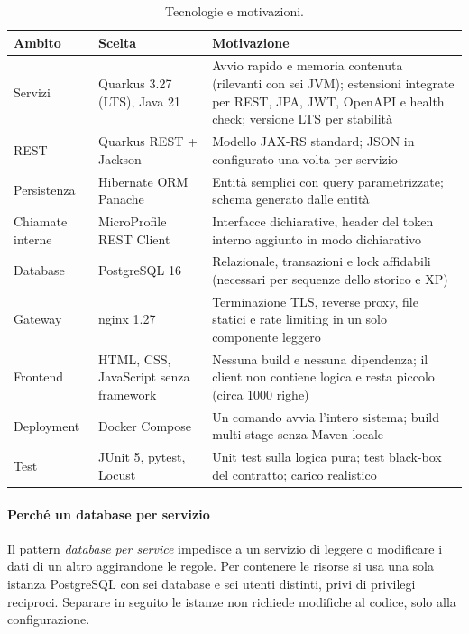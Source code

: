 \documentclass[11pt,a4paper]{report}
\begin{document}
\begin{table}[ht]
\centering\small
\begin{tabularx}{\linewidth}{@{}P{2.6cm}P{3.6cm}L@{}}
\toprule
\textbf{Ambito} & \textbf{Scelta} & \textbf{Motivazione} \\
\midrule
Servizi & Quarkus 3.27 (LTS), Java 21 & Avvio rapido e memoria contenuta (rilevanti con sei JVM); estensioni integrate per REST, JPA, JWT, OpenAPI e health check; versione LTS per stabilità \\
REST & Quarkus REST + Jackson & Modello JAX-RS standard; JSON in  configurato una volta per servizio \\
Persistenza & Hibernate ORM Panache & Entità semplici con query parametrizzate; schema generato dalle entità \\
Chiamate interne & MicroProfile REST Client & Interfacce dichiarative, header del token interno aggiunto in modo dichiarativo \\
Database & PostgreSQL 16 & Relazionale, transazioni e lock affidabili (necessari per sequenze dello storico e XP) \\
Gateway & nginx 1.27 & Terminazione TLS, reverse proxy, file statici e rate limiting in un solo componente leggero \\
Frontend & HTML, CSS, JavaScript senza framework & Nessuna build e nessuna dipendenza; il client non contiene logica e resta piccolo (circa 1000 righe) \\
Deployment & Docker Compose & Un comando avvia l'intero sistema; build multi-stage senza Maven locale \\
Test & JUnit 5, pytest, Locust & Unit test sulla logica pura; test black-box del contratto; carico realistico \\
\bottomrule
\end{tabularx}
\caption{Tecnologie e motivazioni.}
\end{table}

\paragraph{Perché un database per servizio}
Il pattern \emph{database per service} impedisce a un servizio di leggere o modificare i dati di un altro aggirandone le regole. Per contenere le risorse si usa una sola istanza PostgreSQL con sei database e sei utenti distinti, privi di privilegi reciproci. Separare in seguito le istanze non richiede modifiche al codice, solo alla configurazione.
\end{document}
